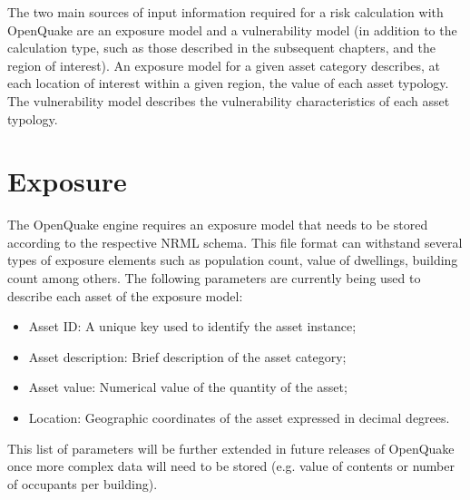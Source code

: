 The two main sources of input information required for a risk calculation with OpenQuake are an exposure model and a vulnerability model (in addition to the calculation type, such as those described in the subsequent chapters, and the region of interest). An exposure model for a given asset category describes, at each location of interest within a given region, the value of each asset typology. The vulnerability model describes the vulnerability characteristics of each asset typology.
\section{Exposure}
The OpenQuake engine requires an exposure model that needs to be stored according to the respective NRML schema. This file format can withstand several types of exposure elements such as population count, value of dwellings, building count among others. The following parameters are currently being used to describe each asset of the exposure model: 

\begin{itemize}
\item Asset ID: A unique key used to identify the asset instance;
\item Asset description: Brief description of the asset category;
\item Asset value: Numerical value of the quantity of the asset;
\item Location: Geographic coordinates of the asset expressed in decimal degrees.
\end{itemize}

This list of parameters will be further extended in future releases of OpenQuake once more complex data will need to be stored (e.g. value of contents or number of occupants per building).  


